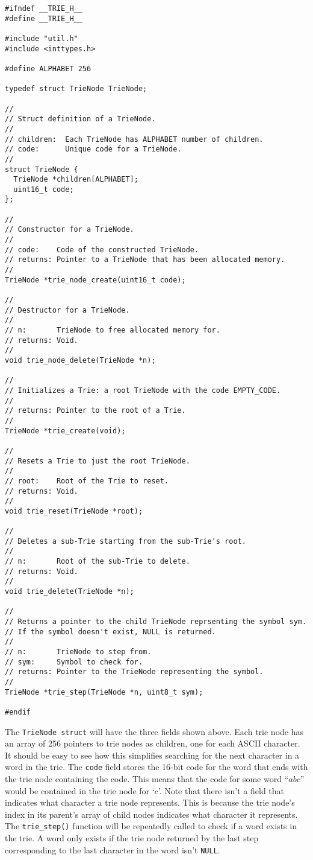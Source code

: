 \documentclass{article}
\begin{document}
\begin{lstlisting}[title=trie.h]
#ifndef __TRIE_H__
#define __TRIE_H__

#include "util.h"
#include <inttypes.h>

#define ALPHABET 256

typedef struct TrieNode TrieNode;

//
// Struct definition of a TrieNode.
//
// children:  Each TrieNode has ALPHABET number of children.
// code:      Unique code for a TrieNode.
//
struct TrieNode {
  TrieNode *children[ALPHABET];
  uint16_t code;
};

//
// Constructor for a TrieNode.
//
// code:    Code of the constructed TrieNode.
// returns: Pointer to a TrieNode that has been allocated memory.
//
TrieNode *trie_node_create(uint16_t code);

//
// Destructor for a TrieNode.
//
// n:       TrieNode to free allocated memory for.
// returns: Void.
//
void trie_node_delete(TrieNode *n);

//
// Initializes a Trie: a root TrieNode with the code EMPTY_CODE.
//
// returns: Pointer to the root of a Trie.
//
TrieNode *trie_create(void);

//
// Resets a Trie to just the root TrieNode.
//
// root:    Root of the Trie to reset.
// returns: Void.
//
void trie_reset(TrieNode *root);

//
// Deletes a sub-Trie starting from the sub-Trie's root.
//
// n:       Root of the sub-Trie to delete.
// returns: Void.
//
void trie_delete(TrieNode *n);

//
// Returns a pointer to the child TrieNode reprsenting the symbol sym.
// If the symbol doesn't exist, NULL is returned.
//
// n:       TrieNode to step from.
// sym:     Symbol to check for.
// returns: Pointer to the TrieNode representing the symbol.
//
TrieNode *trie_step(TrieNode *n, uint8_t sym);

#endif
\end{lstlisting}

The \texttt{TrieNode struct} will have the three fields shown above. Each trie
node has an array of 256 pointers to trie nodes as children, one for each ASCII
character. It should be easy to see how this simplifies searching for the next
character in a word in the trie. The \texttt{code} field stores the 16-bit code
for the word that ends with the trie node containing the code. This means that
the code for some word ``$abc$'' would be contained in the trie node for `$c$'.
Note that there isn't a field that indicates what character a trie node
represents. This is because the trie node's index in its parent's array of child
nodes indicates what character it represents. The \texttt{trie\_step()} function
will be repeatedly called to check if a word exists in the trie. A word only
exists if the trie node returned by the last step corresponding to the last
character in the word isn't \texttt{NULL}.
\end{document}
